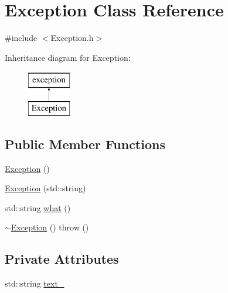 \hypertarget{classException}{\section{Exception Class Reference}
\label{classException}
}


{\ttfamily \#include $<$Exception.\-h$>$}

Inheritance diagram for Exception\-:\begin{figure}[H]
\begin{center}
\leavevmode
\includegraphics[height=2.000000cm]{d4/d67/classException}
\end{center}
\end{figure}
\subsection*{Public Member Functions}
\begin{DoxyCompactItemize}
\item 
\hyperlink{classException_a1b78336bb26edf8e784783cc150c5801}{Exception} ()
\item 
\hyperlink{classException_a63246c90246de105568d97b0164954d8}{Exception} (std\-::string)
\item 
std\-::string \hyperlink{classException_ae40b22a7b2471b142d861bc33b51a820}{what} ()
\item 
\hyperlink{classException_a6b214cd8627d0968bdeebc1fbb9556b8}{$\sim$\-Exception} ()  throw ()
\end{DoxyCompactItemize}
\subsection*{Private Attributes}
\begin{DoxyCompactItemize}
\item 
std\-::string \hyperlink{classException_a404e79b557f64d95acfb5dccbb864860}{text\-\_\-}
\end{DoxyCompactItemize}


